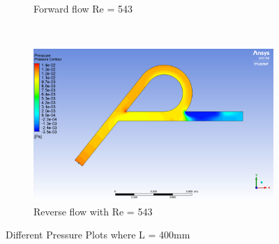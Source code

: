 \begin{figure}[H]
\begin{subfigure}{.45\textwidth}
  \caption{Forward flow Re = 543}
  \label{fig:x_d_norm}
\end{subfigure}%
~
\begin{subfigure}{.45\textwidth}
  \centering
  \includegraphics[width=.9\linewidth]{images/task2/L400/reverse543.png}
  \caption{Reverse flow with Re = 543}
  \label{fig:x_d_norm_actual}
\end{subfigure}

\caption{Different Pressure Plots where L = 400mm}
\label{fig:l400}
\end{figure}


